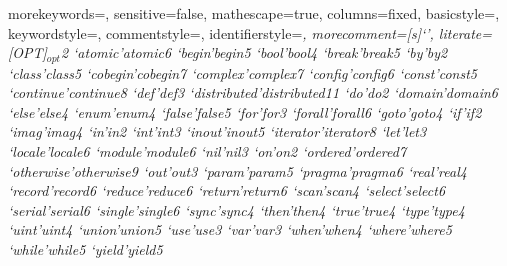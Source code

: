   {
    morekeywords={},
    sensitive=false,
    mathescape=true,
    columns=fixed,
    basicstyle=\footnotesize,
    keywordstyle=\footnotesize,
    commentstyle=\footnotesize\ttfamily,
    identifierstyle=\footnotesize\itshape,
    morecomment=[s]{`}{'},
    literate={[OPT]}{{{\scriptsize $_{opt}$}}}{2}
             {`atomic'}{{\ttfamily atomic}}{6}
             {`begin'}{{\ttfamily begin}}{5}
             {`bool'}{{\ttfamily bool}}{4}
             {`break'}{{\ttfamily break}}{5}
             {`by'}{{\ttfamily by}}{2}
             {`class'}{{\ttfamily class}}{5}
             {`cobegin'}{{\ttfamily cobegin}}{7}
             {`complex'}{{\ttfamily complex}}{7}
             {`config'}{{\ttfamily config}}{6}
             {`const'}{{\ttfamily const}}{5}
             {`continue'}{{\ttfamily continue}}{8}
             {`def'}{{\ttfamily def}}{3}
             {`distributed'}{{\ttfamily distributed}}{11}
             {`do'}{{\ttfamily do}}{2}
             {`domain'}{{\ttfamily domain}}{6}
             {`else'}{{\ttfamily else}}{4}
             {`enum'}{{\ttfamily enum}}{4}
             {`false'}{{\ttfamily false}}{5}
             {`for'}{{\ttfamily for}}{3}
             {`forall'}{{\ttfamily forall}}{6}
             {`goto'}{{\ttfamily goto}}{4}
             {`if'}{{\ttfamily if}}{2}
             {`imag'}{{\ttfamily imag}}{4}
             {`in'}{{\ttfamily in}}{2}
             {`int'}{{\ttfamily int}}{3}
             {`inout'}{{\ttfamily inout}}{5}
             {`iterator'}{{\ttfamily iterator}}{8}
             {`let'}{{\ttfamily let}}{3}
             {`locale'}{{\ttfamily locale}}{6}
             {`module'}{{\ttfamily module}}{6}
             {`nil'}{{\ttfamily nil}}{3}
             {`on'}{{\ttfamily on}}{2}
             {`ordered'}{{\ttfamily ordered}}{7}
             {`otherwise'}{{\ttfamily otherwise}}{9}
             {`out'}{{\ttfamily out}}{3}
             {`param'}{{\ttfamily param}}{5}
             {`pragma'}{{\ttfamily pragma}}{6}
             {`real'}{{\ttfamily real}}{4}
             {`record'}{{\ttfamily record}}{6}
             {`reduce'}{{\ttfamily reduce}}{6}
             {`return'}{{\ttfamily return}}{6}
             {`scan'}{{\ttfamily scan}}{4}
             {`select'}{{\ttfamily select}}{6}
             {`serial'}{{\ttfamily serial}}{6}
             {`single'}{{\ttfamily single}}{6}
             {`sync'}{{\ttfamily sync}}{4}
             {`then'}{{\ttfamily then}}{4}
             {`true'}{{\ttfamily true}}{4}
             {`type'}{{\ttfamily type}}{4}
             {`uint'}{{\ttfamily uint}}{4}
             {`union'}{{\ttfamily union}}{5}
             {`use'}{{\ttfamily use}}{3}
             {`var'}{{\ttfamily var}}{3}
             {`when'}{{\ttfamily when}}{4}
             {`where'}{{\ttfamily where}}{5}
             {`while'}{{\ttfamily while}}{5}
             {`yield'}{{\ttfamily yield}}{5}
  }


\newcommand{\sntx}[1]{\lstinline[language=syntax]!#1!}
